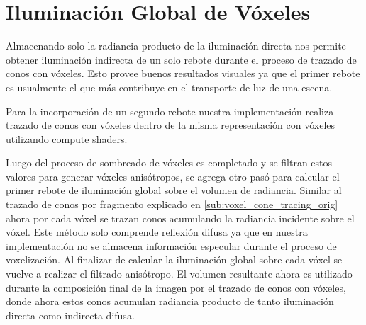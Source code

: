 \section{Iluminación Global de Vóxeles} %
\label{sec:iluminacion_global_de_voxeles}
Almacenando solo la radiancia producto de la iluminación directa nos permite obtener iluminación indirecta de un solo rebote durante el proceso de trazado de conos con vóxeles. Esto provee buenos resultados visuales ya que el primer rebote es usualmente el que más contribuye en el transporte de luz de una escena.

Para la incorporación de un segundo rebote nuestra implementación realiza trazado de conos con vóxeles dentro de la misma representación con vóxeles utilizando compute shaders. 

Luego del proceso de sombreado de vóxeles es completado y se filtran estos valores para generar vóxeles anisótropos, se agrega otro pasó para calcular el primer rebote de iluminación global sobre el volumen de radiancia. Similar al trazado de conos por fragmento explicado en \ref{sub:voxel_cone_tracing_orig} ahora por cada vóxel se trazan conos acumulando la radiancia incidente sobre el vóxel. Este método solo comprende reflexión difusa ya que en nuestra implementación no se almacena información especular durante el proceso de voxelización. Al finalizar de calcular la iluminación global sobre cada vóxel se vuelve a realizar el filtrado anisótropo. El volumen resultante ahora es utilizado durante la composición final de la imagen por el trazado de conos con vóxeles, donde ahora estos conos acumulan radiancia producto de tanto iluminación directa como indirecta difusa.
